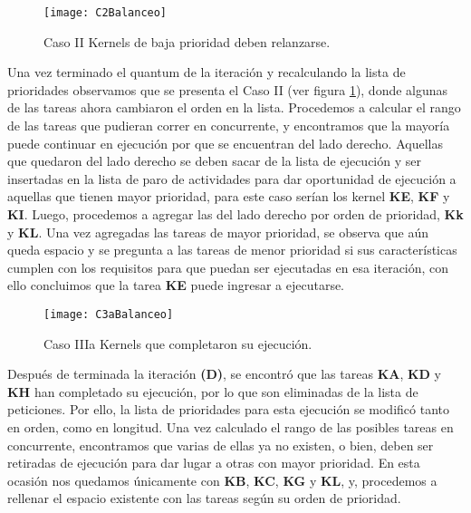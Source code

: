     \begin{figure}[!]
      \centering
        \texttt{[image: C2Balanceo]}
        \caption{Caso II Kernels de baja prioridad deben relanzarse.}
        \label{fig:C2Balanceo}
    \end{figure}
    
    Una vez terminado el quantum de la iteración y recalculando la lista de prioridades observamos que se presenta el Caso II (ver figura \ref{fig:C2Balanceo}), donde algunas de las tareas ahora cambiaron el orden en la lista. Procedemos a calcular el rango de las tareas que pudieran correr en concurrente, y encontramos que la mayoría puede continuar en ejecución por que se encuentran del lado derecho. Aquellas que quedaron del lado derecho se deben sacar de la lista de ejecución y ser insertadas en la lista de paro de actividades para dar oportunidad de ejecución a aquellas que tienen mayor prioridad, para este caso serían los kernel \textbf{KE}, \textbf{KF} y \textbf{KI}. Luego, procedemos a agregar las del lado derecho por orden de prioridad, \textbf{Kk} y \textbf{KL}. 
    Una vez agregadas las tareas de mayor prioridad, se observa que aún queda espacio y se pregunta a las tareas de menor prioridad si sus características cumplen con los requisitos para que puedan ser ejecutadas en esa iteración, con ello concluimos que la tarea \textbf{KE} puede ingresar a ejecutarse.     
    \newline
    
    \begin{figure}[!]
      \centering
        \texttt{[image: C3aBalanceo]}
        \caption{Caso IIIa Kernels que completaron su ejecución.}
        \label{fig:C3aBalanceo}
    \end{figure}

    Después de terminada la iteración \textbf{(D)}, se encontró que las tareas \textbf{KA}, \textbf{KD} y \textbf{KH} han completado su ejecución, por lo que son eliminadas de la lista de peticiones. Por ello, la lista de prioridades para esta ejecución se modificó tanto en orden, como en longitud. Una vez calculado el rango de las posibles tareas en concurrente, encontramos que varias de ellas ya no existen, o bien, deben ser retiradas de ejecución para dar lugar a otras con mayor prioridad. En esta ocasión nos quedamos únicamente con \textbf{KB}, \textbf{KC}, \textbf{KG} y \textbf{KL}, y, procedemos a rellenar el espacio existente con las tareas según su orden de prioridad. 
    \newline
    
